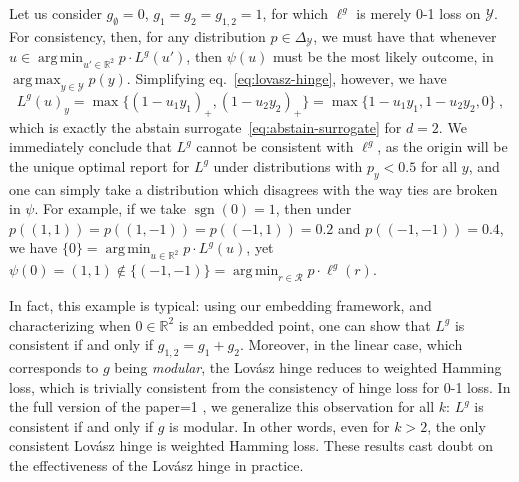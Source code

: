\documentclass[12pt]{article}
\newcommand{\Comments}{1}
\newcommand{\mytodo}[2]{\ifnum\Comments=1%
  \todo[linecolor=#1!80!black,backgroundcolor=#1,bordercolor=#1!80!black]{#2}\fi}
\newcommand{\raft}[1]{\mytodo{green!20!white}{RF: #1}}
\newcommand{\reals}{\mathbb{R}}
\newcommand{\simplex}{\Delta_\Y}
\newcommand{\R}{\mathcal{R}}
\newcommand{\Y}{\mathcal{Y}}
\DeclareMathOperator*{\argmax}{arg\,max}
\DeclareMathOperator*{\argmin}{arg\,min}
\DeclareMathOperator*{\sgn}{sgn}
\begin{document}
Let us consider $g_\emptyset = 0$, $g_1 = g_2 = g_{1,2} = 1$, for which $\ell^g$ is merely 0-1 loss on $\Y$.
For consistency, then, for any distribution $p\in\simplex$, we must have that whenever $u \in \argmin_{u'\in\reals^2} p\cdot L^g(u')$, then $\psi(u)$ must be the most likely outcome, in $\argmax_{y\in\Y} p(y)$.
Simplifying eq.~\eqref{eq:lovasz-hinge}, however, we have
\begin{equation}
  \label{eq:lovasz-hinge-abstain}
  L^g(u)_y = \max\bigl\{(1-u_1y_1)_+,(1-u_2y_2)_+\bigr\} = \max\bigl\{1-u_1y_1,1-u_2y_2,0\bigr\}~,
\end{equation}
which is exactly the abstain surrogate~\eqref{eq:abstain-surrogate} for $d=2$.
We immediately conclude that $L^g$ cannot be consistent with $\ell^g$, as the origin will be the unique optimal report for $L^g$ under distributions with $p_y < 0.5$ for all $y$, and one can simply take a distribution which disagrees with the way ties are broken in $\psi$.
For example, if we take $\sgn(0) = 1$, then under $p((1,1)) = p((1,-1)) = p((-1,1)) = 0.2$ and $p((-1,-1)) = 0.4$, we have $\{0\} = \argmin_{u\in\reals^2} p\cdot L^g(u)$, yet $\psi(0) = (1,1) \notin \{(-1,-1)\} = \argmin_{r\in\R} p\cdot\ell^g(r)$.

In fact, this example is typical: using our embedding framework, and characterizing when $0\in\reals^2$ is an embedded point, one can show that $L^g$ is consistent if and only if $g_{1,2} = g_1 + g_2$.
Moreover, in the linear case, which corresponds to $g$ being \emph{modular}, the Lov\'asz hinge reduces to weighted Hamming loss, which is trivially consistent from the consistency of hinge loss for 0-1 loss.
In the full version of the paper\raft{add cite later}, we generalize this observation for all $k$: $L^g$ is consistent if and only if $g$ is modular.
In other words, even for $k>2$, the only consistent Lov\'asz hinge is weighted Hamming loss.
These results cast doubt on the effectiveness of the Lov\'asz hinge in practice.


\end{document}
